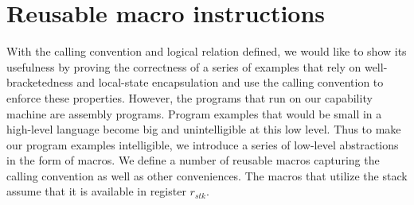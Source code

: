 \documentclass[format=acmsmall, review=true, screen=true]{acmart}
\newcommand{\var}[1]{\mathit{#1}}
\newcommand{\stk}{\var{stk}}
\newenvironment{toplas}%
    {\color{OliveGreen}}{}
\newcommand{\itoplassug}[1]{}
\begin{document}
\begin{toplas}
\section{Reusable macro instructions}
\label{sec:macros}
With the calling convention and logical relation defined, we would like to show its usefulness by proving
the correctness of a series of examples that rely
on well-bracketedness and local-state encapsulation and use the calling
convention to enforce these properties. However, the programs that
run on our capability machine are assembly programs. Program examples that would
be small in a high-level language become big and unintelligible at this
low level. Thus to make our program examples intelligible, we introduce a
series of low-level abstractions in the form of macros.
We define a number of reusable macros capturing the calling convention as well
as other conveniences. The macros that utilize the stack assume that it is
available in register $r_\stk$.
\itoplassug{Lau, suggestion: should we mention temporary registers? They are
  used in the macros, but it seems like a minor technical detail.}


\end{toplas}
\end{document}
